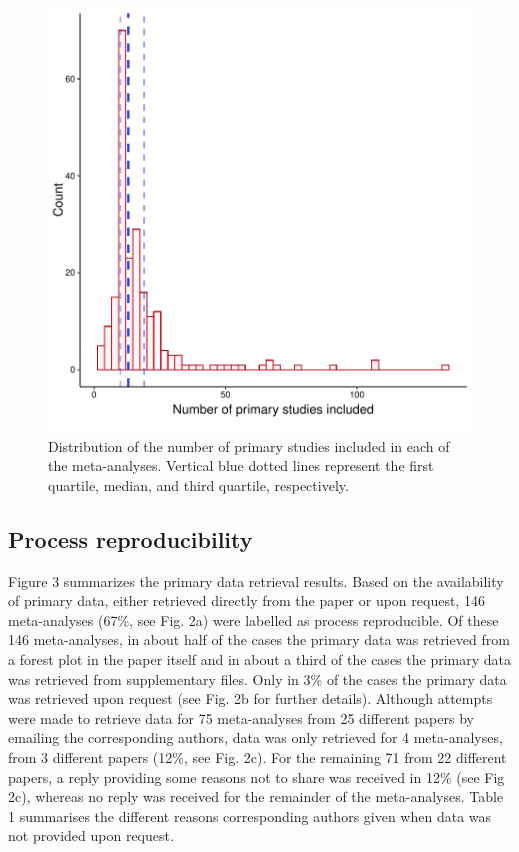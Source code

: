 \documentclass[
  ,jou, a4paper,floatsintext]{apa6}
\begin{document}
\begin{figure}
\centering
\includegraphics{manuscript_files/figure-latex/unnamed-chunk-1-1.pdf}
\caption{\label{fig:unnamed-chunk-1}Distribution of the number of primary studies included in each of the meta-analyses. Vertical blue dotted lines represent the first quartile, median, and third quartile, respectively.}
\end{figure}

\hypertarget{process-reproducibility}{%
\subsection{Process reproducibility}\label{process-reproducibility}}

Figure 3 summarizes the primary data retrieval results. Based on the availability of primary data, either retrieved directly from the paper or upon request, 146 meta-analyses (67\%, see Fig. 2a) were labelled as process reproducible. Of these 146 meta-analyses, in about half of the cases the primary data was retrieved from a forest plot in the paper itself and in about a third of the cases the primary data was retrieved from supplementary files. Only in 3\% of the cases the primary data was retrieved upon request (see Fig. 2b for further details). Although attempts were made to retrieve data for 75 meta-analyses from 25 different papers by emailing the corresponding authors, data was only retrieved for 4 meta-analyses, from 3 different papers (12\%, see Fig. 2c). For the remaining 71 from 22 different papers, a reply providing some reasons not to share was received in 12\% (see Fig 2c), whereas no reply was received for the remainder of the meta-analyses. Table 1 summarises the different reasons corresponding authors given when data was not provided upon request.
\end{document}
